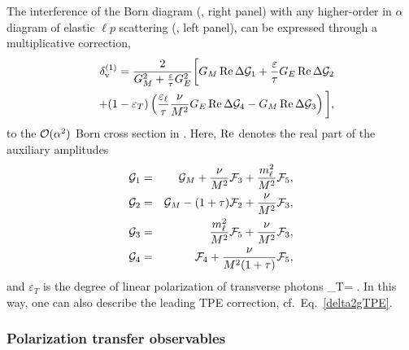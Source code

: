 The interference of the Born diagram (, right panel) with any higher-order in $\alpha$ diagram of elastic $\ell p$ scattering (, left panel), can be expressed through a multiplicative correction, 
\begin{eqnarray} \label{eq:delta_TPE_massive}
&&\delta^{(1)}_{\rm v} = \frac{2}{ G_M^2 + \frac{\varepsilon}{\tau} G_E^2}
\bigg[ G_M \re \Delta\cG_1 + \frac{\varepsilon}{\tau} G_E \re \Delta\cG_2 \nonumber \\
&&\hspace{-0.4cm}+(1-\varepsilon_T)\left(\frac{\varepsilon_\ell}{\tau}\frac{\nu}{M^2}  G_E \re \Delta\cG_4  - G_M \re \Delta\cG_3 \right) \bigg],
\end{eqnarray}
 to the $\mathcal{O}(\alpha^2)$ Born cross section in .  
Here, $\operatorname{Re}$ denotes the real part of the auxiliary amplitudes
\begin{eqnarray}\eqlab{cGamps}
 \cG_1 & = & \cG_M + \frac{\nu}{M^2} \cF_3 + \frac{m_\ell^2}{M^2} \cF_5, \label{eq:G1} \\
 \cG_2 & = & \cG_M - ( 1 + \tau ) \cF_2 + \frac{\nu}{M^2} \cF_3,  \\
 \cG_3 & = & \frac{m_\ell^2}{M^2} \cF_5 + \frac{\nu}{M^2} \cF_3,   \\
 \cG_4 & = &    \cF_4 + \frac{\nu}{M^2 (1+\tau)} \cF_5,\label{eq:G4}
\end{eqnarray}
 and
$\varepsilon_T$ is
the degree of linear polarization of transverse photons
\beq
\label{eq:transverse_epsilon}
\varepsilon_T= .
\eeq
In this way, one can also describe the leading TPE correction, cf.\ Eq.~\ref{delta2gTPE}. 

\subsubsection{Polarization transfer observables}



